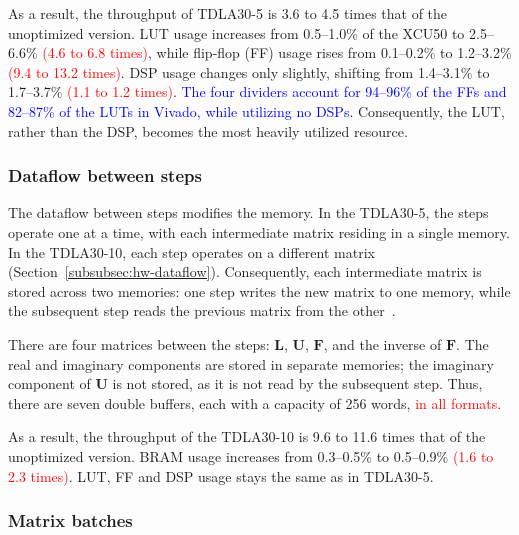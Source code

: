 As a result, the throughput of TDLA30-5 is 3.6 to 4.5 times that of the unoptimized version. LUT usage increases from 0.5–1.0\% of the XCU50 to 2.5–6.6\% \textcolor{red}{(4.6 to 6.8 times)}, while flip-flop (FF) usage rises from 0.1–0.2\% to 1.2–3.2\% \textcolor{red}{(9.4 to 13.2 times)}. DSP usage changes only slightly, shifting from 1.4–3.1\% to 1.7–3.7\% \textcolor{red}{(1.1 to 1.2 times)}.
\textcolor{blue}{The four dividers account for 94–96\% of the FFs and 82–87\% of the LUTs in Vivado, while utilizing no DSPs.} Consequently, the LUT, rather than the DSP, becomes the most heavily utilized resource.

\subsubsection{\texorpdfstring{Dataflow between steps}{Dataflow between steps}}\label{subsubsec:resultados-dataflow}

The dataflow between steps modifies the memory. In the TDLA30-5, the steps operate one at a time, with each intermediate matrix residing in a single memory. In the TDLA30-10, each step operates on a different matrix (Section~\ref{subsubsec:hw-dataflow}). Consequently, each intermediate matrix is stored across two memories: one step writes the new matrix to one memory, while the subsequent step reads the previous matrix from the other~\cite[p.~15]{ug1399}.

There are four matrices between the steps: $\mathbf L$, $\mathbf U$, $\mathbf F$, and the inverse of $\mathbf F$. The real and imaginary components are stored in separate memories; the imaginary component of $\mathbf U$ is not stored, as it is not read by the subsequent step. Thus, there are seven double buffers, each with a capacity of 256 words, \textcolor{red}{in all formats}.

As a result, the throughput of the TDLA30-10 is 9.6 to 11.6 times that of the unoptimized version. BRAM usage increases from 0.3–0.5\% to 0.5–0.9\% \textcolor{red}{(1.6 to 2.3 times)}. LUT, FF and DSP usage stays the same as in TDLA30-5.

\subsubsection{\texorpdfstring{Matrix batches}{Matrix batches}}\label{subsubsec:resultados-lotes}

